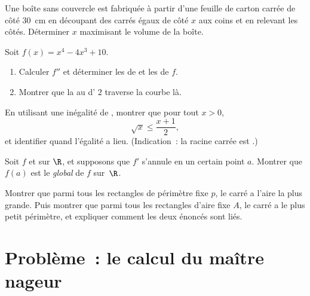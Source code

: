 \begin{exercise}[$\star\star$]\label{exo:g12:deriv:5}
Une boîte sans couvercle est fabriquée à partir d'une feuille de carton
carrée de côté $30$~cm en découpant des carrés égaux de côté $x$ aux coins
et en relevant les côtés. Déterminer $x$ maximisant le volume de la boîte.
\end{exercise}

\begin{exercise}[$\star\star$]\label{exo:g12:deriv:6}
Soit $f(x) = x^4 - 4x^3 + 10$.
\begin{enumerate}
  \item Calculer $f''$ et déterminer les  de  et les
         de $f$.
  \item Montrer que la  au  d' $2$ traverse
        la courbe là.
\end{enumerate}
\end{exercise}

\begin{exercise}[$\star\star$]\label{exo:g12:deriv:7}
En utilisant une inégalité de , montrer que pour tout $x > 0$,
\[
\sqrt{x} \leq \frac{x + 1}{2},
\]
et identifier quand l'égalité a lieu. (Indication~: la racine carrée est
.)
\end{exercise}

\begin{exercise}[$\star\star\star$]\label{exo:g12:deriv:8}
Soit $f$  et  sur $\R$, et supposons que $f'$ s'annule en
un certain point $a$. Montrer que $f(a)$ est le  \emph{global} de
$f$ sur~$\R$.
\end{exercise}

\begin{exercise}[$\star\star\star$]\label{exo:g12:deriv:9}
Montrer que parmi tous les rectangles de périmètre fixe $p$, le carré a
l'aire la plus grande. Puis montrer que parmi tous les rectangles d'aire
fixe $A$, le carré a le plus petit périmètre, et expliquer comment les
deux énoncés sont liés.
\end{exercise}

\section{Problème~: le calcul du maître nageur}

